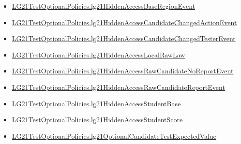 \documentclass[10pt]{article}
\begin{document}
\begin{itemize}
\item \hyperlink{governing-declaration-cecb402908ae7bf6}{LG21\allowbreak{}Test\allowbreak{}Optional\allowbreak{}Policies.\allowbreak{}lg21\allowbreak{}Hidden\allowbreak{}Access\allowbreak{}Base\allowbreak{}Region\allowbreak{}Event}
\item \hyperlink{governing-declaration-de5bd154d0bff426}{LG21\allowbreak{}Test\allowbreak{}Optional\allowbreak{}Policies.\allowbreak{}lg21\allowbreak{}Hidden\allowbreak{}Access\allowbreak{}Candidate\allowbreak{}Changed\allowbreak{}Action\allowbreak{}Event}
\item \hyperlink{governing-declaration-872860e778f2e7e0}{LG21\allowbreak{}Test\allowbreak{}Optional\allowbreak{}Policies.\allowbreak{}lg21\allowbreak{}Hidden\allowbreak{}Access\allowbreak{}Candidate\allowbreak{}Changed\allowbreak{}Tester\allowbreak{}Event}
\item \hyperlink{governing-declaration-021e105247bd247f}{LG21\allowbreak{}Test\allowbreak{}Optional\allowbreak{}Policies.\allowbreak{}lg21\allowbreak{}Hidden\allowbreak{}Access\allowbreak{}Local\allowbreak{}Raw\allowbreak{}Law}
\item \hyperlink{governing-declaration-c4a1b26beb260711}{LG21\allowbreak{}Test\allowbreak{}Optional\allowbreak{}Policies.\allowbreak{}lg21\allowbreak{}Hidden\allowbreak{}Access\allowbreak{}Raw\allowbreak{}Candidate\allowbreak{}No\allowbreak{}Report\allowbreak{}Event}
\item \hyperlink{governing-declaration-4c74d9d193ce39dc}{LG21\allowbreak{}Test\allowbreak{}Optional\allowbreak{}Policies.\allowbreak{}lg21\allowbreak{}Hidden\allowbreak{}Access\allowbreak{}Raw\allowbreak{}Candidate\allowbreak{}Report\allowbreak{}Event}
\item \hyperlink{governing-declaration-10af39de5a9d1826}{LG21\allowbreak{}Test\allowbreak{}Optional\allowbreak{}Policies.\allowbreak{}lg21\allowbreak{}Hidden\allowbreak{}Access\allowbreak{}Student\allowbreak{}Base}
\item \hyperlink{governing-declaration-e4d0c619bb8c334b}{LG21\allowbreak{}Test\allowbreak{}Optional\allowbreak{}Policies.\allowbreak{}lg21\allowbreak{}Hidden\allowbreak{}Access\allowbreak{}Student\allowbreak{}Score}
\item \hyperlink{governing-declaration-d0454f59d5aac8fb}{LG21\allowbreak{}Test\allowbreak{}Optional\allowbreak{}Policies.\allowbreak{}lg21\allowbreak{}Optional\allowbreak{}Candidate\allowbreak{}Test\allowbreak{}Expected\allowbreak{}Value}
\end{itemize}
\hypertarget{governing-declaration-b8206670d6659592}{}
\end{document}
